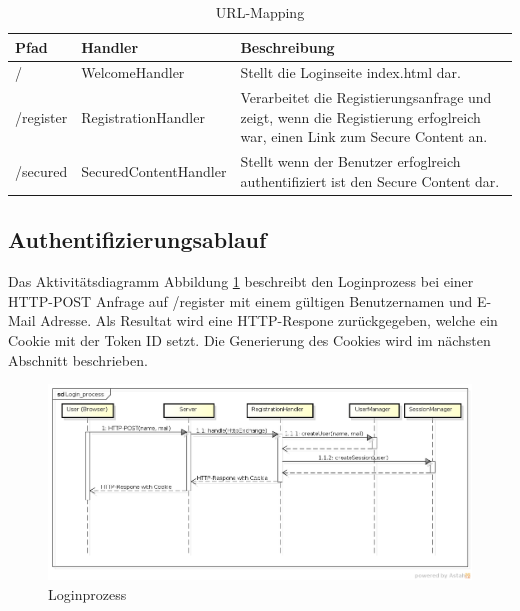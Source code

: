 \begin{table}[H]
\begin{center}
\begin{tabular}{l l p{7cm} }
\hline
\textbf{Pfad} & \textbf{Handler}    & \textbf{Beschreibung} \\ \hline \hline
/             & WelcomeHandler          & Stellt die Loginseite index.html dar.\\
/register     & RegistrationHandler     & Verarbeitet die Registierungsanfrage und zeigt, wenn die Registierung erfoglreich war, einen Link zum Secure Content an. \\
/secured      & SecuredContentHandler   & Stellt wenn der Benutzer erfoglreich authentifiziert ist den Secure Content dar.\\
\hline \hline
\end{tabular}
\caption{URL-Mapping}
\label{tab:url-mapping}
\end{center}
\end{table}

\subsection{Authentifizierungsablauf}

Das Aktivitätsdiagramm Abbildung \ref{fig:process} beschreibt den Loginprozess bei einer HTTP-POST Anfrage auf /register mit einem gültigen Benutzernamen und E-Mail Adresse.
Als Resultat wird eine HTTP-Respone zurückgegeben, welche ein Cookie mit der Token ID setzt. Die Generierung des Cookies wird im nächsten Abschnitt beschrieben.

\begin{figure}[H]
	\begin{center}
		\includegraphics[width=1.0\textwidth]{./content/Login_process.png}
	\end{center}
	\caption{Loginprozess}
	\label{fig:process}
\end{figure}

